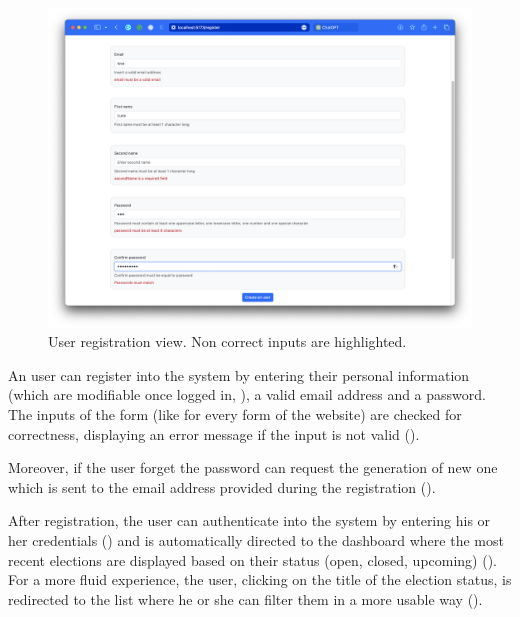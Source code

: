 \documentclass{scrartcl}
\begin{document}
\begin{figure}
    \centering
    \includegraphics[width=0.88\linewidth]{figures/story-board/4-user-registration.png}
    \caption{User registration view. Non correct inputs are highlighted.}
    \label{fig:user-registration}
\end{figure}
\restoregeometry

An user can register into the system by entering their personal information (which are modifiable once logged in, ), a valid email address and a password.
%
The inputs of the form (like for every form of the website) are checked for correctness, displaying an error message if the input is not valid ().

Moreover, if the user forget the password can request the generation of  new one which is sent to the email address provided during the registration ().

After registration, the user can authenticate into the system by entering his or her credentials () and is automatically directed to the dashboard where the most recent elections are displayed based on their status (open, closed, upcoming) ().
%
For a more fluid experience, the user, clicking on the title of the election status, is redirected to the list where he or she can filter them in a more usable way ().
\end{document}
